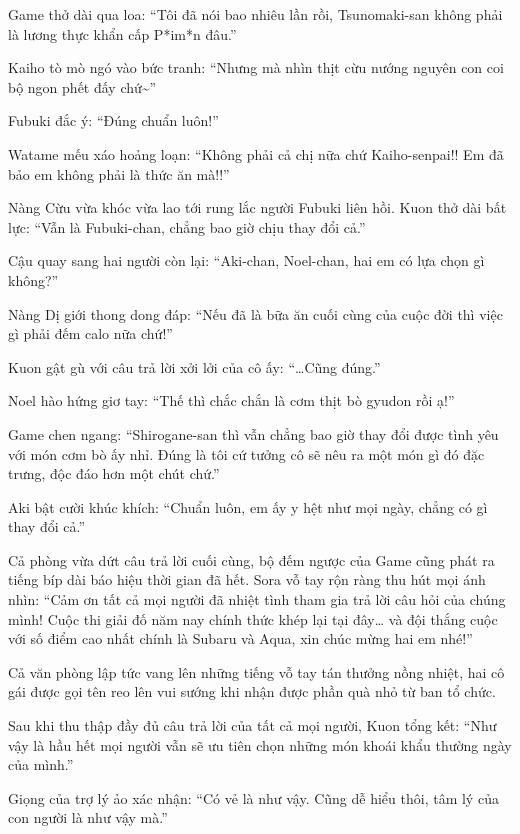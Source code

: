 \documentclass[../main.tex]{subfiles}
\begin{document}

Game thở dài qua loa: ``Tôi đã nói bao nhiêu lần rồi, Tsunomaki-san không phải là lương thực khẩn cấp P*im*n đâu.''

Kaiho tò mò ngó vào bức tranh: ``Nhưng mà nhìn thịt cừu nướng nguyên con coi bộ ngon phết đấy chứ\~{}''

Fubuki đắc ý: ``Đúng chuẩn luôn!''

Watame mếu xáo hoảng loạn: ``Không phải cả chị nữa chứ Kaiho-senpai!! Em đã bảo em không phải là thức ăn mà!!''

Nàng Cừu vừa khóc vừa lao tới rung lắc người Fubuki liên hồi. Kuon thở dài bất lực: ``Vẫn là Fubuki-chan, chẳng bao giờ chịu thay đổi cả.''

Cậu quay sang hai người còn lại: ``Aki-chan, Noel-chan, hai em có lựa chọn gì không?''

Nàng Dị giới thong dong đáp: ``Nếu đã là bữa ăn cuối cùng của cuộc đời thì việc gì phải đếm calo nữa chứ!''


Kuon gật gù với câu trả lời xởi lởi của cô ấy: ``\dots Cũng đúng.''

Noel hào hứng giơ tay: ``Thế thì chắc chắn là cơm thịt bò gyudon rồi ạ!''

Game chen ngang: ``Shirogane-san thì vẫn chẳng bao giờ thay đổi được tình yêu với món cơm bò ấy nhỉ. Đúng là tôi cứ tưởng cô sẽ nêu ra một món gì đó đặc trưng, độc đáo hơn một chút chứ.''

Aki bật cười khúc khích: ``Chuẩn luôn, em ấy y hệt như mọi ngày, chẳng có gì thay đổi cả.''

Cả phòng vừa dứt câu trả lời cuối cùng, bộ đếm ngược của Game cũng phát ra tiếng bíp dài báo hiệu thời gian đã hết. Sora vỗ tay rộn ràng thu hút mọi ánh nhìn: ``Cảm ơn tất cả mọi người đã nhiệt tình tham gia trả lời câu hỏi của chúng mình! Cuộc thi giải đố năm nay chính thức khép lại tại đây\dots{} và đội thắng cuộc với số điểm cao nhất chính là  Subaru và Aqua, xin chúc mừng hai em nhé!''

Cả văn phòng lập tức vang lên những tiếng vỗ tay tán thưởng nồng nhiệt, hai cô gái được gọi tên reo lên vui sướng khi nhận được phần quà nhỏ từ ban tổ chức.

Sau khi thu thập đầy đủ câu trả lời của tất cả mọi người, Kuon tổng kết: ``Như vậy là hầu hết mọi người vẫn sẽ ưu tiên chọn những món khoái khẩu thường ngày của mình.''

Giọng của trợ lý ảo xác nhận: ``Có vẻ là như vậy. Cũng dễ hiểu thôi, tâm lý của con người là như vậy mà.''
\end{document}
